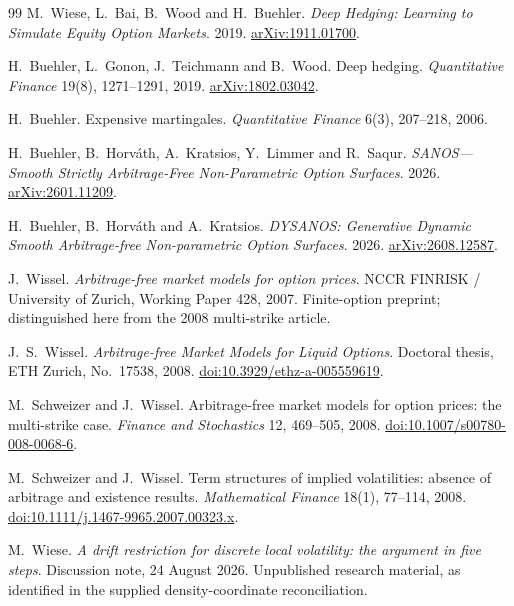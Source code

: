 \documentclass[11pt,a4paper]{article}
\numberwithin{equation}{section}
\theoremstyle{definition}\newtheorem{definition}[theorem]{Definition}
\theoremstyle{remark}\newtheorem{remark}[theorem]{Remark}
\begin{document}
\begingroup\small
\begin{thebibliography}{99}
M.~Wiese, L.~Bai, B.~Wood and H.~Buehler.
\emph{Deep Hedging: Learning to Simulate Equity Option Markets}.
2019. \href{https://arxiv.org/abs/1911.01700}{arXiv:1911.01700}.

H.~Buehler, L.~Gonon, J.~Teichmann and B.~Wood.
Deep hedging. \emph{Quantitative Finance} 19(8), 1271--1291, 2019.
\href{https://arxiv.org/abs/1802.03042}{arXiv:1802.03042}.

H.~Buehler. Expensive martingales.
\emph{Quantitative Finance} 6(3), 207--218, 2006.

H.~Buehler, B.~Horv\'ath, A.~Kratsios, Y.~Limmer and R.~Saqur.
\emph{SANOS---Smooth Strictly Arbitrage-Free Non-Parametric Option Surfaces}.
2026. \href{https://arxiv.org/abs/2601.11209}{arXiv:2601.11209}.

H.~Buehler, B.~Horv\'ath and A.~Kratsios.
\emph{DYSANOS: Generative Dynamic Smooth Arbitrage-free Non-parametric Option Surfaces}.
2026. \href{https://arxiv.org/abs/2608.12587}{arXiv:2608.12587}.

J.~Wissel. \emph{Arbitrage-free market models for option prices}.
NCCR FINRISK / University of Zurich, Working Paper 428, 2007.
Finite-option preprint; distinguished here from the 2008 multi-strike article.

J.~S.~Wissel. \emph{Arbitrage-free Market Models for Liquid Options}.
Doctoral thesis, ETH Zurich, No.~17538, 2008.
\href{https://doi.org/10.3929/ethz-a-005559619}{doi:10.3929/ethz-a-005559619}.

M.~Schweizer and J.~Wissel.
Arbitrage-free market models for option prices: the multi-strike case.
\emph{Finance and Stochastics} 12, 469--505, 2008.
\href{https://doi.org/10.1007/s00780-008-0068-6}{doi:10.1007/s00780-008-0068-6}.

M.~Schweizer and J.~Wissel.
Term structures of implied volatilities: absence of arbitrage and existence results.
\emph{Mathematical Finance} 18(1), 77--114, 2008.
\href{https://doi.org/10.1111/j.1467-9965.2007.00323.x}{doi:10.1111/j.1467-9965.2007.00323.x}.

M.~Wiese. \emph{A drift restriction for discrete local volatility: the argument in five steps}.
Discussion note, 24 August 2026. Unpublished research material, as identified in the supplied density-coordinate reconciliation.


\end{thebibliography}
\end{document}
